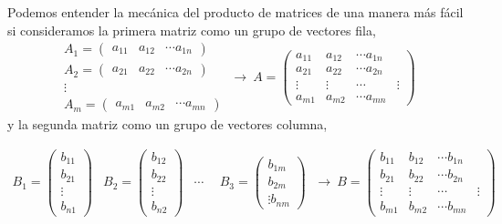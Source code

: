 Podemos entender la mecánica del producto de matrices de una manera más fácil si consideramos  la primera matriz como un grupo de vectores fila,
\begin{equation*}
\begin{aligned}
A_1=\begin{pmatrix}
a_{11}& a_{12}& \cdots a_{1n}
\end{pmatrix}\\
A_2=\begin{pmatrix}
a_{21}& a_{22}& \cdots a_{2n}
\end{pmatrix}\\
\vdots \  \ \   \  \  \  \ \ \ \ \\
A_m=\begin{pmatrix}
a_{m1}& a_{m2}& \cdots a_{mn}
\end{pmatrix}
\end{aligned} \ \rightarrow \ 
A=\begin{pmatrix}
a_{11}& a_{12}& \cdots a_{1n}\\
a_{21}& a_{22}& \cdots a_{2n}\\
\vdots& \vdots& \cdots& \vdots \\
a_{m1}& a_{m2}& \cdots a_{mn}
\end{pmatrix}
\end{equation*}
y la segunda matriz como un grupo de vectores columna,

\begin{equation*}
\begin{aligned}
B_1=\begin{pmatrix}
b_{11}\\ b_{21}\\ \vdots \\ b_{n1}
\end{pmatrix}&
B_2=\begin{pmatrix}
b_{12}\\ b_{22}\\ \vdots\\ b_{n2}
\end{pmatrix} &
\cdots  \  \  &
B_3=\begin{pmatrix}
b_{1m}\\ b_{2m}\\ \vdots  b_{nm}
\end{pmatrix}
\end{aligned} \ \rightarrow \ 
B=\begin{pmatrix}
b_{11}& b_{12}& \cdots b_{1n}\\
b_{21}& b_{22}& \cdots b_{2n}\\
\vdots& \vdots& \cdots& \vdots \\
b_{m1}& b_{m2}& \cdots b_{mn}
\end{pmatrix}
\end{equation*}

